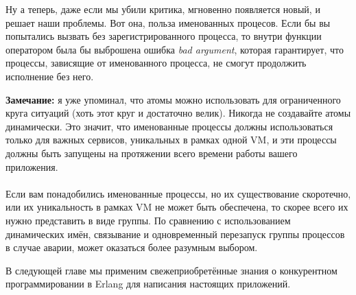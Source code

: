 Ну а теперь, даже если мы убили критика, мгновенно появляется новый, и решает наши проблемы.
Вот она, польза именованных процесов.
Если бы вы попытались вызвать  без зарегистрированного процесса, то внутри функции оператором \ops{!} была бы выброшена ошибка \emph{bad argument}, которая гарантирует, что процессы, зависящие от именованного процесса, не смогут продолжить исполнение без него.\\
\colorbox{lgray}
{
\begin{minipage}{1.0\linewidth}
    \textbf{Замечание:} я уже упоминал, что атомы можно использовать для ограниченного круга ситуаций (хоть этот круг и достаточно велик).
Никогда не создавайте атомы динамически.
Это значит, что именованные процессы должны использоваться только для важных сервисов, уникальных в рамках одной VM, и эти процессы должны быть запущены на протяжении всего времени работы вашего приложения.\\
\\
Если вам понадобились именованные процессы, но их существование скоротечно, или их уникальность в рамках VM не может быть обеспечена, то скорее всего их нужно представить в виде группы.
По сравнению с использованием динамических имён, связывание и одновременный перезапуск группы процессов в случае аварии, может оказаться более разумным выбором.
\end{minipage}
}

В следующей главе мы применим свежеприобретённые знания о конкурентном программировании в Erlang для написания настоящих приложений.
